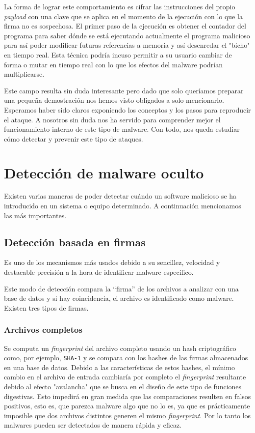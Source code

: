 \documentclass[12pt]{article}
\newcommand{\newpar} {
    \vskip 0.5cm
}
\begin{document}
                \newpar

                La forma de lograr este comportamiento es cifrar las instrucciones del propio \textit{payload} con una clave que se aplica en el momento de la ejecución con lo que la firma no es sospechosa. El primer paso de la ejecución es obtener el contador del programa para saber dónde se está ejecutando actualmente el programa malicioso para así poder modificar futuras referencias a memoria y así desenredar el "bicho" en tiempo real. Esta técnica podría incuso permitir a su usuario cambiar de forma o mutar en tiempo real con lo que los efectos del malware podrían multiplicarse.

                \newpar

                Este campo resulta sin duda interesante pero dado que solo queríamos preparar una pequeña demostración nos hemos visto obligados a solo mencionarlo. Esperamos haber sido claros exponiendo los conceptos y los pasos para reproducir el ataque. A nosotros sin duda nos ha servido para comprender mejor el funcionamiento interno de este tipo de malware. Con todo, nos queda estudiar cómo detectar y prevenir este tipo de ataques.

    \section{Detección de malware oculto}
        Existen varias maneras de poder detectar cuándo un software malicioso se ha introducido en un sistema o equipo determinado. A continuación mencionamos las más importantes.

        \subsection{Detección basada en firmas}
            Es uno de los mecanismos más usados debido a su sencillez, velocidad y destacable precisión a la hora de identificar malware específico.

            Este modo de detección compara la “firma” de los archivos a analizar con una base de datos y si hay coincidencia, el archivo es identificado como malware. Existen tres tipos de firmas.

            \subsubsection{Archivos completos}
                Se computa un \textit{fingerprint} del archivo completo usando un hash criptográfico como, por ejemplo, \texttt{SHA-1} y se compara con los hashes de las firmas almacenados en una base de datos. Debido a las características de estos hashes, el mínimo cambio en el archivo de entrada cambiaría por completo el \textit{fingerprint} resultante debido al efecto "avalancha" que se busca en el diseño de este tipo de funciones digestivas. Esto impedirá en gran medida que las comparaciones resulten en falsos positivos, esto es, que parezca malware algo que no lo es, ya que es prácticamente imposible que dos archivos distintos generen el mismo \textit{fingerprint}. Por lo tanto los malwares pueden ser detectados de manera rápida y eficaz.
\end{document}
